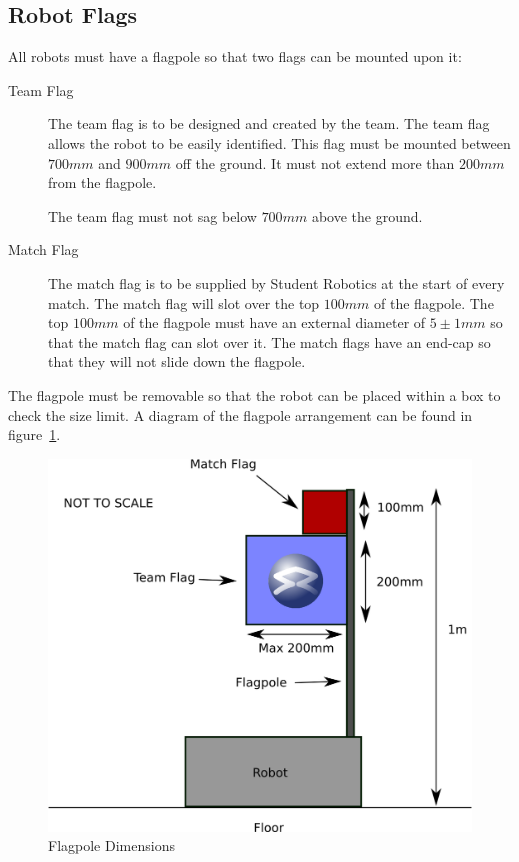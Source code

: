 \subsection{Robot Flags}
\label{sec:flags}
All robots must have a flagpole so that two flags can be mounted upon it:
\begin{description}
\item[Team Flag] The team flag is to be designed and created by the team.
 The team flag allows the robot to be easily identified.
 This flag must be mounted between $700mm$ and $900mm$ off the ground.
 It must not extend more than $200mm$ from the flagpole.

The team flag must not sag below $700mm$ above the ground.
\item[Match Flag] The match flag is to be supplied by Student Robotics at the start of every match.
 The match flag will slot over the top $100mm$ of the flagpole.
 The top $100mm$ of the flagpole must have an external diameter of $5\pm1mm$ so that the match flag can slot over it.
 The match flags have an end-cap so that they will not slide down the flagpole.
\end{description}

The flagpole must be removable so that the robot can be placed within a box to check the size limit.
A diagram of the flagpole arrangement can be found in figure~\ref{fig:flag}.

\begin{figure}
\begin{center}
\includegraphics[keepaspectratio, scale =1]{./images/flag.png}
\caption{\label{fig:flag}Flagpole Dimensions}
\end{center}
\end{figure}
\clearpage
